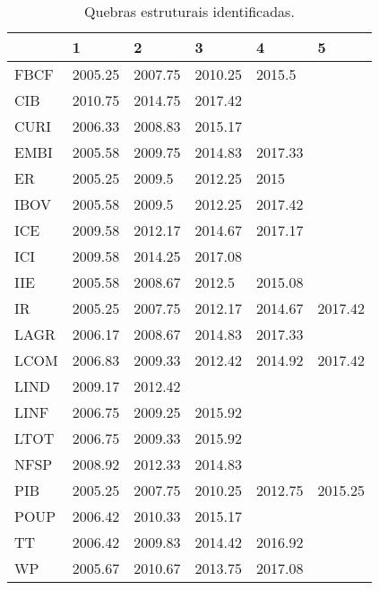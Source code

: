 \begin{table}[!htb]
\centering
\caption{Quebras estruturais
				identificadas.} 
\label{tab:breaktablem}
\begin{tabular}{llllll}
  \toprule
 & 1 & 2 & 3 & 4 & 5 \\ 
  \midrule
FBCF & 2005.25 & 2007.75 & 2010.25 & 2015.5 &  \\ 
  CIB & 2010.75 & 2014.75 & 2017.42 &  &  \\ 
  CURI & 2006.33 & 2008.83 & 2015.17 &  &  \\ 
  EMBI & 2005.58 & 2009.75 & 2014.83 & 2017.33 &  \\ 
  ER & 2005.25 & 2009.5 & 2012.25 & 2015 &  \\ 
  IBOV & 2005.58 & 2009.5 & 2012.25 & 2017.42 &  \\ 
  ICE & 2009.58 & 2012.17 & 2014.67 & 2017.17 &  \\ 
  ICI & 2009.58 & 2014.25 & 2017.08 &  &  \\ 
  IIE & 2005.58 & 2008.67 & 2012.5 & 2015.08 &  \\ 
  IR & 2005.25 & 2007.75 & 2012.17 & 2014.67 & 2017.42 \\ 
  LAGR & 2006.17 & 2008.67 & 2014.83 & 2017.33 &  \\ 
  LCOM & 2006.83 & 2009.33 & 2012.42 & 2014.92 & 2017.42 \\ 
  LIND & 2009.17 & 2012.42 &  &  &  \\ 
  LINF & 2006.75 & 2009.25 & 2015.92 &  &  \\ 
  LTOT & 2006.75 & 2009.33 & 2015.92 &  &  \\ 
  NFSP & 2008.92 & 2012.33 & 2014.83 &  &  \\ 
  PIB & 2005.25 & 2007.75 & 2010.25 & 2012.75 & 2015.25 \\ 
  POUP & 2006.42 & 2010.33 & 2015.17 &  &  \\ 
  TT & 2006.42 & 2009.83 & 2014.42 & 2016.92 &  \\ 
  WP & 2005.67 & 2010.67 & 2013.75 & 2017.08 &  \\ 
   \bottomrule
\end{tabular}
\end{table}
